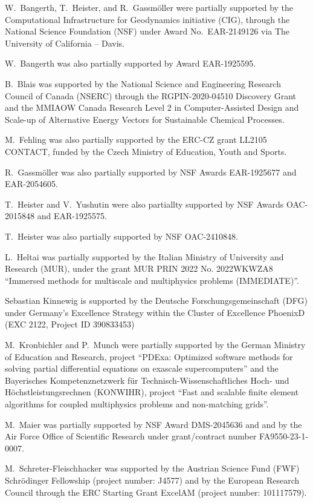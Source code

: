 \documentclass{ansarticle-preprint}
\begin{document}
W.~Bangerth, T.~Heister, and R.~Gassm\"{o}ller were partially
supported by the Computational Infrastructure for Geodynamics initiative
(CIG), through the National Science Foundation (NSF) under Award
No.~EAR-2149126 via The University of California -- Davis.

W.~Bangerth was also partially supported by Award EAR-1925595.

B.~Blais was supported by the National Science and Engineering Research Council of Canada (NSERC)  through the RGPIN-2020-04510 Discovery Grant and the MMIAOW Canada Research Level 2 in Computer-Assisted Design and Scale-up of Alternative Energy Vectors for Sustainable Chemical Processes.

M.~Fehling was also partially supported by the ERC-CZ grant LL2105
CONTACT, funded by the Czech Ministry of Education, Youth and Sports.

R.~Gassm\"{o}ller was also partially supported by NSF Awards EAR-1925677
and EAR-2054605.

T.~Heister and V.~Yushutin were also partiallty supported by NSF Awards OAC-2015848 and EAR-1925575.

T.~Heister was also partially supported by NSF OAC-2410848.

L.~Heltai was partially supported by the Italian Ministry of
University and Research (MUR), under the grant MUR PRIN 2022 No. 2022WKWZA8
``Immersed methods for multiscale and multiphysics problems (IMMEDIATE)''.

Sebastian Kinnewig is supported by the Deutsche Forschungsgemeinschaft (DFG) under Germany’s Excellence
Strategy within the Cluster of Excellence PhoenixD (EXC 2122, Project ID 390833453)

M.~Kronbichler and P.~Munch were partially supported by the
German Ministry of Education and Research, project
``PDExa: Optimized software methods for solving partial differential
equations on exascale supercomputers'' and the Bayerisches Kompetenznetzwerk
f\"ur Technisch-Wissen\-schaft\-li\-ches Hoch- und H\"ochstleistungsrechnen
(KONWIHR), project ``Fast and scalable finite element algorithms for coupled
multiphysics problems and non-matching grids''.

M.~Maier was partially supported by NSF Award DMS-2045636 and and by the
Air Force Office of Scientific Research under grant/contract number
FA9550-23-1-0007.


M.~Schreter-Fleischhacker was supported by the Austrian Science Fund (FWF) Schrödinger Fellowship (project number: J4577) and by the European Research Council
through the ERC Starting Grant ExcelAM (project number: 101117579).
\end{document}
